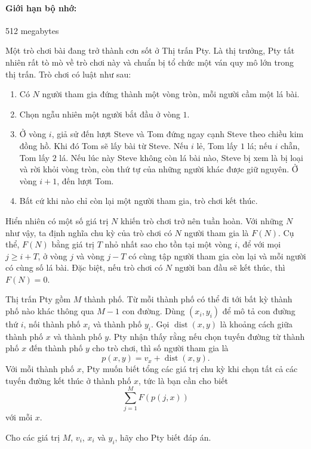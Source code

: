 \documentclass[11pt]{article}
\begin{document}
\paragraph{Giới hạn bộ nhớ:} 512 megabytes

Một trò chơi bài đang trở thành cơn sốt ở Thị trấn Pty. Là thị trưởng, Pty
tất nhiên rất tò mò về trò chơi này và chuẩn bị tổ chức một ván quy mô lớn
trong thị trấn. Trò chơi có luật như sau:
\begin{enumerate}
  \item Có \(N\) người tham gia đứng thành một vòng tròn, mỗi người cầm một
  lá bài.
  \item Chọn ngẫu nhiên một người bắt đầu ở vòng \(1\).
  \item Ở vòng \(i\), giả sử đến lượt Steve và Tom đứng ngay cạnh Steve theo
  chiều kim đồng hồ. Khi đó Tom sẽ lấy bài từ Steve. Nếu \(i\) lẻ, Tom lấy
  \(1\) lá; nếu \(i\) chẵn, Tom lấy \(2\) lá. Nếu lúc này Steve không còn lá
  bài nào, Steve bị xem là bị loại và rời khỏi vòng tròn, còn thứ tự của
  những người khác được giữ nguyên. Ở vòng \(i+1\), đến lượt Tom.
  \item Bất cứ khi nào chỉ còn lại một người tham gia, trò chơi kết thúc.
\end{enumerate}

Hiển nhiên có một số giá trị \(N\) khiến trò chơi trở nên tuần hoàn. Với
những \(N\) như vậy, ta định nghĩa chu kỳ của trò chơi có \(N\) người tham gia
là \(F(N)\). Cụ thể, \(F(N)\) bằng giá trị \(T\) nhỏ nhất sao cho tồn tại một
vòng \(i\), để với mọi \(j\ge i+T\), ở vòng \(j\) và vòng \(j-T\) có cùng tập
người tham gia còn lại và mỗi người có cùng số lá bài. Đặc biệt, nếu trò chơi
có \(N\) người ban đầu sẽ kết thúc, thì \(F(N)=0\).

Thị trấn Pty gồm \(M\) thành phố. Từ mỗi thành phố có thể đi tới bất kỳ thành
phố nào khác thông qua \(M-1\) con đường. Dùng \((x_i,y_i)\) để mô tả con
đường thứ \(i\), nối thành phố \(x_i\) và thành phố \(y_i\). Gọi
\(\operatorname{dist}(x,y)\) là khoảng cách giữa thành phố \(x\) và thành phố
\(y\). Pty nhận thấy rằng nếu chọn tuyến đường từ thành phố \(x\) đến thành
phố \(y\) cho trò chơi, thì số người tham gia là
\[
  p(x,y)=v_x+\operatorname{dist}(x,y).
\]
Với mỗi thành phố \(x\), Pty muốn biết tổng các giá trị chu kỳ khi chọn tất cả
các tuyến đường kết thúc ở thành phố \(x\), tức là bạn cần cho biết
\[
  \sum_{j=1}^{M} F(p(j,x))
\]
với mỗi \(x\).

Cho các giá trị \(M\), \(v_i\), \(x_i\) và \(y_i\), hãy cho Pty biết đáp án.
\end{document}
